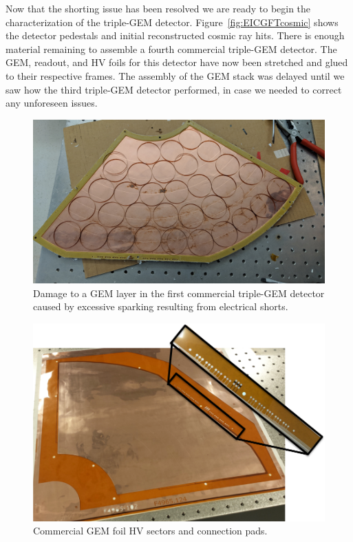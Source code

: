 Now that the shorting issue has been resolved we are ready to begin the characterization of the triple-GEM detector. Figure~\ref{fig:EICGFTcosmic} shows the detector pedestals and initial reconstructed cosmic ray hits.
There is enough material remaining to assemble a fourth commercial triple-GEM detector. The GEM, readout, and HV foils for this detector have now been stretched and glued to their respective frames. The assembly of the GEM stack was delayed until we saw how the third triple-GEM detector performed, in case we needed to correct any unforeseen issues.

\begin{figure}
\center
\includegraphics[width=\columnwidth]{TU_plots/GEM-spark.jpg}
\caption{Damage to a GEM layer in the first commercial triple-GEM detector caused by excessive sparking resulting from electrical shorts.}
\label{fig:spark}
\end{figure}


\begin{figure}
\center
\includegraphics[width=\columnwidth]{TU_plots/GEM-HVPad.png}
\caption{Commercial GEM foil HV sectors and connection pads.}
\label{fig:EICFGT}
\end{figure}

